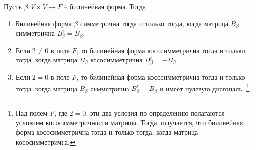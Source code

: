\begin{claim}
\label{claim::BilSymAntiSym}
Пусть $\beta\colon V\times V\to F$ -- билинейная форма.
Тогда
\begin{enumerate}
\item Билинейная форма $\beta$ симметрична тогда и только тогда, когда матрица $B_\beta$ симметрична $B_\beta^t = B_\beta$.

\item Если $2\neq 0$ в поле $F$, то билинейная форма кососимметрична тогда и только тогда, когда матрица $B_\beta$ кососимметрична $B_\beta^t = - B_\beta$.

\item Если $2 = 0$ в поле $F$, то билинейная форма кососимметрична тогда и только тогда, когда матрица $B_\beta$ симметрична $B_\beta^t = B_\beta$ и имеет нулевую диагональ.%
\footnote{
\label{foot::AntiSymMatrix}
Над полем $F$, где $2 = 0$, эти два условия по определению полагаются условием кососимметричности матрицы.
Тогда получается, что билинейная форма кососимметрична тогда и только тогда, когда матрица кососимметрична.}
\end{enumerate}
\end{claim}
